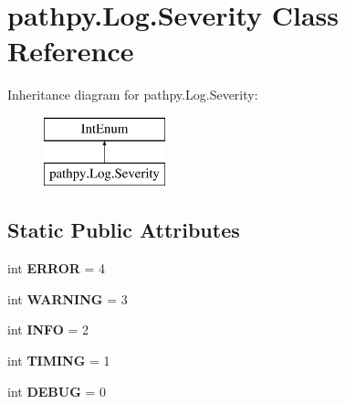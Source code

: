 \hypertarget{classpathpy_1_1Log_1_1Severity}{\section{pathpy.\-Log.\-Severity Class Reference}
\label{classpathpy_1_1Log_1_1Severity}
}
Inheritance diagram for pathpy.\-Log.\-Severity\-:\begin{figure}[H]
\begin{center}
\leavevmode
\includegraphics[height=2.000000cm]{classpathpy_1_1Log_1_1Severity}
\end{center}
\end{figure}
\subsection*{Static Public Attributes}
\begin{DoxyCompactItemize}
\item 
\hypertarget{classpathpy_1_1Log_1_1Severity_aa2e434a659bbb9f2e2c25e47fab1dc37}{int {\bfseries E\-R\-R\-O\-R} = 4}\label{classpathpy_1_1Log_1_1Severity_aa2e434a659bbb9f2e2c25e47fab1dc37}

\item 
\hypertarget{classpathpy_1_1Log_1_1Severity_ae4a13b6d9d1d2485bceb5843df6e3f40}{int {\bfseries W\-A\-R\-N\-I\-N\-G} = 3}\label{classpathpy_1_1Log_1_1Severity_ae4a13b6d9d1d2485bceb5843df6e3f40}

\item 
\hypertarget{classpathpy_1_1Log_1_1Severity_a12fb98e4cc0d9e68114e29e8f6758c22}{int {\bfseries I\-N\-F\-O} = 2}\label{classpathpy_1_1Log_1_1Severity_a12fb98e4cc0d9e68114e29e8f6758c22}

\item 
\hypertarget{classpathpy_1_1Log_1_1Severity_a0c184f8e48c1f5cb7f795d00c9205ed5}{int {\bfseries T\-I\-M\-I\-N\-G} = 1}\label{classpathpy_1_1Log_1_1Severity_a0c184f8e48c1f5cb7f795d00c9205ed5}

\item 
\hypertarget{classpathpy_1_1Log_1_1Severity_ad6d71133083c6972a8400a1e4b355381}{int {\bfseries D\-E\-B\-U\-G} = 0}\label{classpathpy_1_1Log_1_1Severity_ad6d71133083c6972a8400a1e4b355381}

\end{DoxyCompactItemize}


